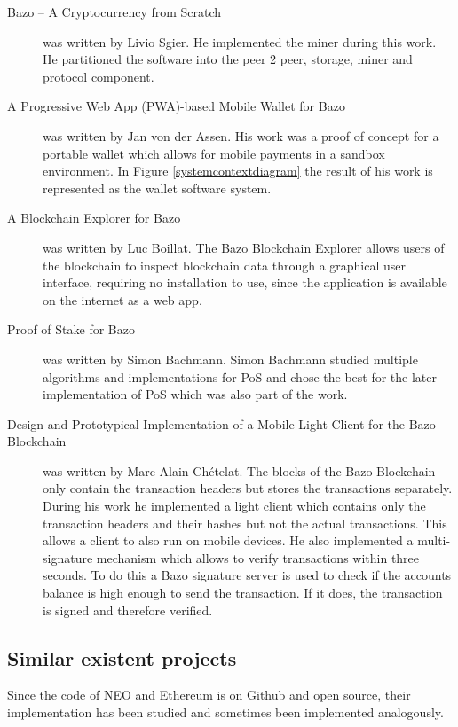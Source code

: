 \begin{description}
	\item [Bazo – A Cryptocurrency from Scratch \cite{ba_miner}] was written by Livio Sgier. He implemented the miner during this work. He partitioned the software into the peer 2 peer, storage, miner and protocol \gls{component}.
	\item [A Progressive Web App (PWA)-based Mobile Wallet for Bazo \cite{ba_wallet}] was written by Jan von der Assen. His work was a proof of concept for a portable wallet which allows for mobile payments in a sandbox environment. In Figure \ref{systemcontextdiagram} the result of his work is represented as the wallet software system.
	\item [A Blockchain Explorer for Bazo \cite{ba_explorer}] was written by Luc Boillat. The Bazo Blockchain Explorer allows users of the blockchain to inspect blockchain data through a graphical user interface, requiring no installation to use, since the application is available on the internet as a web app. \cite{ba_explorer}
	\item [Proof of Stake for Bazo \cite{ba_pos}] was written by Simon Bachmann. Simon Bachmann studied multiple algorithms and implementations for PoS and chose the best for the later implementation of PoS which was also part of the work.
	\item [Design and Prototypical Implementation of a Mobile Light Client for the Bazo Blockchain \cite{ba_client}] was written by Marc-Alain Chételat. The blocks of the Bazo Blockchain only contain the transaction headers but stores the transactions separately. During his work he implemented a light client which contains only the transaction headers and their hashes but not the actual transactions. This allows a client to also run on mobile devices. He also 	implemented a multi-signature mechanism which allows to verify transactions within three seconds.  To do this a Bazo signature server is used to check if the accounts balance is high enough to send the transaction. If it does, the transaction is signed and therefore verified. 
\end{description}

\subsection{Similar existent projects}
Since the code of NEO and Ethereum is on Github and open source, their implementation has been studied and sometimes been implemented analogously. 

